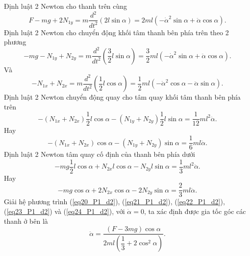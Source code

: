 Định luật 2 Newton cho thanh trên cùng
\begin{equation} \label{eq20_P1_d2}
    F - mg + 2N_{1y} = m \dfrac{d^2}{dt^2} \left( 2 l \sin \alpha \right) = 2ml \left( - \dot{\alpha}^2 \sin \alpha + \ddot{\alpha} \cos \alpha \right).
\end{equation}
Định luật 2 Newton cho chuyển động khối tâm thanh bên phía trên theo 2 phương
\begin{equation} \label{eq21_P1_d2}
    -mg - N_{1y} + N_{2y} = m \dfrac{d^2}{dt^2} \left( \dfrac{3}{2} l \sin \alpha \right) = \dfrac{3}{2} ml \left( - \dot{\alpha}^2 \sin \alpha + \ddot{\alpha} \cos \alpha \right).
\end{equation}
Và
\begin{equation} \label{eq22_P1_d2}
    - N_{1x} + N_{2x} = m \dfrac{d^2}{dt^2} \left( \dfrac{1}{2} l \cos \alpha \right) = \dfrac{1}{2} ml \left( - \dot{\alpha}^2 \cos \alpha - \ddot{\alpha} \sin \alpha \right).
\end{equation}
Định luật 2 Newton chuyển động quay cho tâm quay khối tâm thanh bên phía trên
\begin{equation*}
    -\left( N_{1x} + N_{2x} \right) \dfrac{1}{2} l \cos \alpha - \left( N_{1y} + N_{2y} \right) \dfrac{1}{2} l \sin \alpha = \dfrac{1}{12} m l^2 \ddot{\alpha}.
\end{equation*}
Hay
\begin{equation} \label{eq23_P1_d2}
    -\left( N_{1x} + N_{2x} \right)\cos \alpha - \left( N_{1y} + N_{2y} \right) \sin \alpha = \dfrac{1}{6} m l \ddot{\alpha}.
\end{equation}
Định luật 2 Newton tâm quay cố định của thanh bên phía dưới
\begin{equation*}
    -mg \dfrac{1}{2} l \cos \alpha + N_{2x} l \cos \alpha - N_{2y} l \sin \alpha = \dfrac{1}{3} m l^2 \ddot{\alpha}.
\end{equation*}
Hay
\begin{equation} \label{eq24_P1_d2}
    -mg \cos \alpha + 2 N_{2x} \cos \alpha - 2 N_{2y} \sin \alpha = \dfrac{2}{3} m l \ddot{\alpha}.
\end{equation}
Giải hệ phương trình (\ref{eq20_P1_d2}), (\ref{eq21_P1_d2}), (\ref{eq22_P1_d2}), (\ref{eq23_P1_d2}) và (\ref{eq24_P1_d2}), với $\dot{\alpha}=0$, ta xác định được gia tốc góc các thanh ở bên là
\begin{equation*}
    \ddot{\alpha} = \dfrac{(F-3mg) \cos \alpha}{2 ml \left( \dfrac{1}{3} + 2 \cos^2 \alpha \right) }.
\end{equation*}

